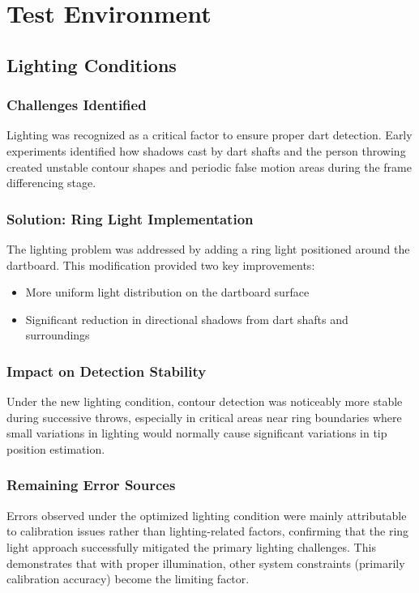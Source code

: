 \setauthor{\secondauthor}

\section{Test Environment}
\subsection{Lighting Conditions}

\subsubsection{Challenges Identified}
Lighting was recognized as a critical factor to ensure proper dart detection. Early experiments identified how shadows cast by dart shafts and the person throwing created unstable contour shapes and periodic false motion areas during the frame differencing stage.

\subsubsection{Solution: Ring Light Implementation}
The lighting problem was addressed by adding a ring light positioned around the dartboard. This modification provided two key improvements:
\begin{itemize}
	\item More uniform light distribution on the dartboard surface
	\item Significant reduction in directional shadows from dart shafts and surroundings
\end{itemize}

\subsubsection{Impact on Detection Stability}
Under the new lighting condition, contour detection was noticeably more stable during successive throws, especially in critical areas near ring boundaries where small variations in lighting would normally cause significant variations in tip position estimation.

\subsubsection{Remaining Error Sources}
Errors observed under the optimized lighting condition were mainly attributable to calibration issues rather than lighting-related factors, confirming that the ring light approach successfully mitigated the primary lighting challenges. This demonstrates that with proper illumination, other system constraints (primarily calibration accuracy) become the limiting factor.


